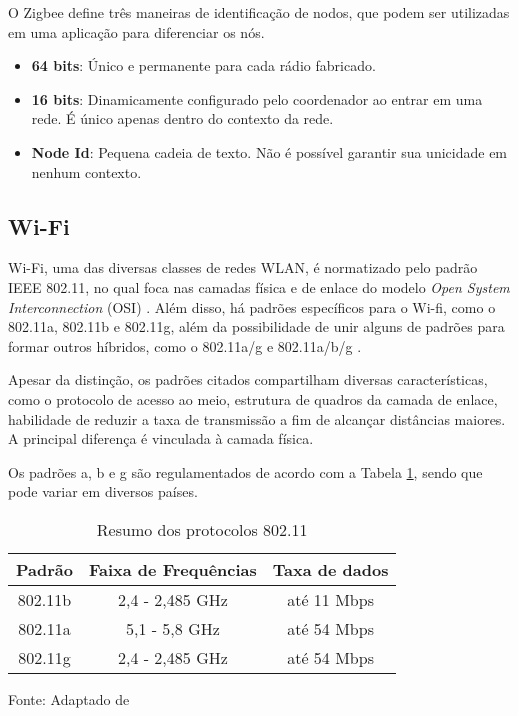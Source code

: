 O Zigbee define três maneiras de identificação de nodos, que podem ser utilizadas em uma aplicação para diferenciar os nós.

\begin{itemize}[noitemsep,topsep=5pt]
	\item \textbf{64 bits}: Único e permanente para cada rádio fabricado.
	\item \textbf{16 bits}: Dinamicamente configurado pelo coordenador ao entrar em uma rede. É único apenas 
	dentro do contexto da rede.
	\item \textbf{Node Id}: Pequena cadeia de texto. Não é possível garantir sua unicidade em nenhum contexto.
\end{itemize}

\subsection{Wi-Fi}
Wi-Fi, uma das diversas classes de redes WLAN, é normatizado pelo padrão IEEE 802.11, no qual foca nas camadas física e de enlace do modelo \textit{Open System Interconnection} (OSI) \cite{Gast2005}. 
Além disso, há padrões específicos para o Wi-fi, como o 802.11a, 802.11b e 802.11g,  além da possibilidade de unir alguns de padrões para formar outros híbridos, como o 802.11a/g e 802.11a/b/g \cite{Kurose2012}. 


Apesar da distinção, os padrões citados compartilham diversas características, como o protocolo de acesso ao meio, estrutura de quadros da camada de enlace, habilidade de reduzir a taxa de transmissão a fim de alcançar distâncias maiores. A principal diferença é vinculada à camada física.

Os padrões a, b e g são regulamentados de acordo com a Tabela \ref{tab:ieee80211abg-phy}, sendo que pode variar em diversos países.

\begin{table}[htb]
    \caption{Resumo dos protocolos 802.11}
    \label{tab:ieee80211abg-phy}
    \begin{tabular}{@{}ccc@{}}
        \toprule
        \textbf{Padrão} & \textbf{Faixa de Frequências} & \textbf{Taxa de dados} \\ \midrule
        802.11b         & 2,4 - 2,485 GHz               & até 11 Mbps            \\
        802.11a         & 5,1 - 5,8 GHz                 & até 54 Mbps            \\
        802.11g         & 2,4 - 2,485 GHz               & até 54 Mbps            \\ \bottomrule 
        \end{tabular}
        
    Fonte: Adaptado de 
\end{table}


